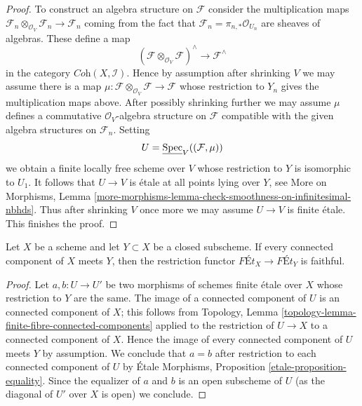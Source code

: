 \begin{proof}
\medskip\noindent
To construct an algebra structure on $\mathcal{F}$ consider the multiplication
maps
$\mathcal{F}_n \otimes_{\mathcal{O}_V} \mathcal{F}_n \to \mathcal{F}_n$
coming from the fact that $\mathcal{F}_n = \pi_{n, *}\mathcal{O}_{U_n}$
are sheaves of algebras. These define a map
$$
(\mathcal{F}\otimes_{\mathcal{O}_V} \mathcal{F})^\wedge
\longrightarrow
\mathcal{F}^\wedge
$$
in the category $\textit{Coh}(X, \mathcal{I})$. Hence by assumption
after shrinking $V$ we may assume there is a map
$\mu : \mathcal{F}\otimes_{\mathcal{O}_V} \mathcal{F} \to \mathcal{F}$
whose restriction to $Y_n$ gives the multiplication maps above.
After possibly shrinking further we may assume $\mu$
defines a commutative $\mathcal{O}_V$-algebra
structure on $\mathcal{F}$ compatible with the given algebra
structures on $\mathcal{F}_n$.
Setting
$$
U = \underline{\mathop{\mathrm{Spec}}}_V((\mathcal{F}, \mu))
$$
we obtain a finite locally free scheme over $V$ whose restriction
to $Y$ is isomorphic to $U_1$. It follows that $U \to V$
is \'etale at all points lying over $Y$, see
More on Morphisms, Lemma
\ref{more-morphisms-lemma-check-smoothness-on-infinitesimal-nbhds}.
Thus after shrinking $V$ once more we may assume $U \to V$ is
finite \'etale. This finishes the proof.
\end{proof}

\begin{lemma}
\label{lemma-restriction-faithful}
Let $X$ be a scheme and let $Y \subset X$ be a closed subscheme.
If every connected component of $X$ meets $Y$, then
the restriction functor $\textit{F\'Et}_X \to \textit{F\'Et}_Y$
is faithful.
\end{lemma}

\begin{proof}
Let $a, b : U \to U'$ be two morphisms of schemes finite \'etale over $X$
whose restriction to $Y$ are the same. The image of a connected component
of $U$ is an connected component of $X$; this follows from
Topology, Lemma \ref{topology-lemma-finite-fibre-connected-components}
applied to the restriction of $U \to X$ to a connected component of $X$.
Hence the image of every connected component of $U$ meets $Y$
by assumption. We conclude that $a = b$ after restriction to each
connected component of $U$ by \'Etale Morphisms, Proposition
\ref{etale-proposition-equality}. Since the equalizer of $a$ and $b$
is an open subscheme of $U$ (as the diagonal of $U'$ over $X$ is open)
we conclude.
\end{proof}

